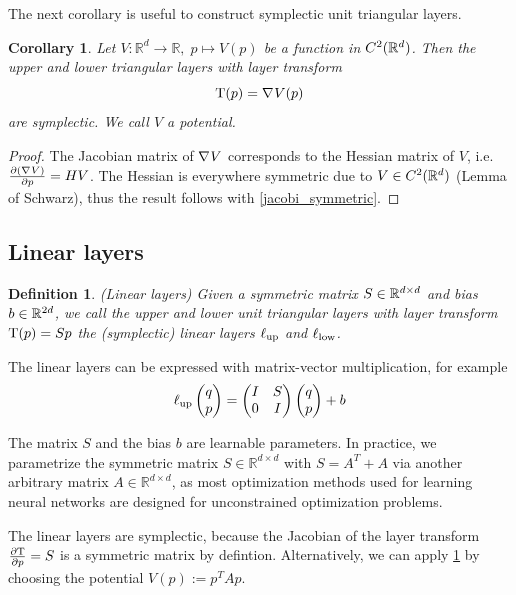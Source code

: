 \documentclass[twoside,a4paper]{article}
\newtheorem{definition}{Definition}
\newtheorem{corollary}{Corollary}
\begin{document}
The next corollary is useful to construct symplectic unit triangular layers.
\begin{corollary}\label{gradient_corollary}
	Let $V: \mathbb{R}^d \to \mathbb{R}, \; p \mapsto V(p)$ be a function in 
	$C^2(\mathbb{R}^d)$. Then the upper and lower triangular layers with layer transform
	\begin{equation*}
		\mathrm{T}(p) = \nabla_{}{V}(p)
	\end{equation*}
	are symplectic. We call $V$ a potential.
\end{corollary}
\begin{proof}
	The Jacobian matrix of $\nabla_{}{V}$ corresponds to the Hessian matrix of $V$,
	i.e. $\frac{\partial (\nabla_{}{V})}{\partial p} = HV$. 
	The Hessian is everywhere symmetric due to $V \in C^2(\mathbb{R}^d)$ (Lemma of Schwarz),
	thus the result follows with \cref{jacobi_symmetric}.
\end{proof}

\subsection{Linear layers}

\begin{definition}
	(Linear layers)
	Given a symmetric matrix $S \in \mathbb{R}^{d \times d}$ and bias $b \in \mathbb{R}^{2d}$,
	we call the upper and lower unit triangular layers
	with layer transform $\mathrm{T}(p) = Sp$ the (symplectic) linear layers $\ell_{\text{up}}$ and $\ell_{\text{low}}$.
\end{definition}

The linear layers can be expressed with matrix-vector multiplication, for example
\begin{equation*}
	\ell_{\text{up}} \begin{pmatrix} q \\ p \end{pmatrix} = \begin{pmatrix}
		I & S \\
		0 & I
	\end{pmatrix} \begin{pmatrix} q \\ p \end{pmatrix} + b
\end{equation*}

The matrix $S$ and the bias $b$ are learnable parameters.
In practice, we parametrize the symmetric matrix $S\in \mathbb{R}^{d \times d}$
with $S = A^T + A$ via another arbitrary matrix $A\in \mathbb{R}^{d \times d}$, as
most optimization methods used for learning neural networks are designed for
unconstrained optimization problems.

The linear layers are symplectic, because the Jacobian of the layer transform $\frac{\partial \mathrm{T}}{\partial p} = S$
is a symmetric matrix by defintion. Alternatively, we can apply \cref{gradient_corollary} by
choosing the potential $V(p) := p^TAp$.
\end{document}
